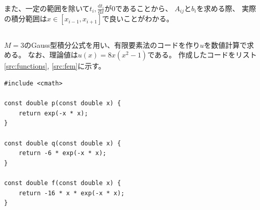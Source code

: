 \documentclass[a4j, titlepage]{jsarticle}
\numberwithin{equation}{section}
\begin{document}
            また、一定の範囲を除いて$t_i, \displaystyle\frac{\mathrm{d}t_i}{\mathrm{d}x}$が0であることから、
            $A_{ij}とb_i$を求める際、
            実際の積分範囲は$x\in[x_{i-1}, x_{i+1}]$で良いことがわかる。

        \subsection{}
            $M=3$のGauss型積分公式を用い、有限要素法のコードを作り$u$を数値計算で求める。
            なお、理論値は$u(x)=8x(x^2-1)$である。
            作成したコードをリスト\ref{src:functions}, \ref{src:fem}に示す。
            \begin{lstlisting}[caption={$p(x), q(x), f(x)$の実装}, label=src:functions]
#include <cmath>

const double p(const double x) {
    return exp(-x * x);
}

const double q(const double x) {
    return -6 * exp(-x * x);
}

const double f(const double x) {
    return -16 * x * exp(-x * x);
}
            \end{lstlisting}
\end{document}

